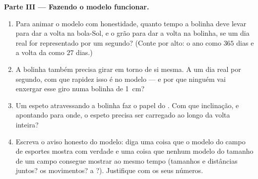 \begin{problem}
\medskip\noindent\textbf{Parte III --- Fazendo o modelo funcionar.}
\begin{enumerate}[resume]
  \item Para animar o modelo com honestidade, quanto tempo a bolinha
        deve levar para dar a volta na bola-Sol, e o grão para dar a
        volta na bolinha, se um dia real for representado por um
        segundo? (Conte por alto: o ano como $365$ dias e a volta da
         como $27$ dias.)
  \item A bolinha também precisa girar em torno de si mesma. A um dia
        real por segundo, com que rapidez isso é no modelo --- e por
        que ninguém vai enxergar esse giro numa bolinha de
        \qty{1}{cm}?
  \item Um espeto atravessando a bolinha faz o papel do . Com que
        inclinação, e apontando para onde, o espeto precisa ser
        carregado ao longo da volta inteira?
  \item Escreva o aviso honesto do modelo: diga uma coisa que o
        modelo do campo de esportes mostra com verdade e uma coisa
        que nenhum modelo do tamanho de um campo consegue mostrar ao
        mesmo tempo (tamanhos e distâncias juntos? os movimentos? a
        ?). Justifique com os seus números.
\end{enumerate}
\end{problem}
